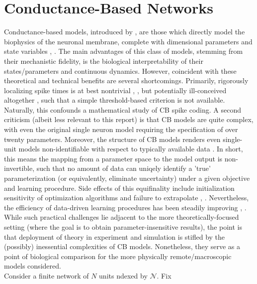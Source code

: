 \documentclass[12pt, oneside]{report}
\newcommand{\1}[1]{\mathbbm{1}_{\{#1\}}}
\newcommand{\mc}[1]{\mathcal{#1}}
\theoremstyle{definition}
\begin{document}
\section{Conductance-Based Networks}\label{sec1}
Conductance-based models, introduced by \cite{Hodgkin_Huxley_1952}, are those
which directly model the biophysics of the neuronal membrane, complete with
dimensional parameters and state variables \cite{Ermentrout_Terman_2010}, \cite{Izhikevich_2007}. The main advantages of this class of models, stemming from
their mechanistic fidelity, is the biological interpretability of their
states/parameters and continuous dynamics. However, coincident with these
theoretical and technical benefits are several shortcomings. Primarily,
rigorously localizing spike times is at best nontrivial \cite{Kistler_Gerstner_Hemmen_1997}, \cite{Platkiewicz_Brette_2010}, \cite{Wang_Wang_Yu_Chen_2016}
but potentially ill-conceived altogether \cite{Koch_Bernander_Douglas_1995}, \cite{Rinzel_Ermentrout_1998} such that a simple threshold-based criterion
is not available. Naturally, this confounds a mathematical study of CB spike
coding. A second criticism (albeit less relevant to this report) is that
CB models are quite complex, with even the original single neuron model
requiring the specification of over twenty parameters. Moreover, the structure
of CB models renders even single-unit models non-identifiable with respect to
typically available data \cite{Walch_Eisenberg_2016}. In short, this means the
mapping from a parameter space to the model output is non-invertible, such that
no amount of data can uniqely identify a 'true' parameterization (or
equivalently, eliminate uncertainty) under a given objective and learning
procedure. Side effects of this equifinality include initialization sensitivity
of optimization algorithms and failure to extrapolate \cite{Daly_Gavaghan_Holmes_Cooper_2015},
\cite{Guillaume_et_al_2019}. Nevertheless, the efficiency of
data-driven learning procedures has been steadily improving \cite{Prinz_Billimoria_Marder_2003},
\cite{Meliza_Kostuk_Huang_Nogaret_Margoliash_Abarbanel_2014}. While such practical challenges lie adjacent to the more
theoretically-focused setting (where the goal is to obtain
parameter-insensitive results), the point is that deployment of theory in experiment and simulation
is stifled by the (possibly) inessential complexities of CB models. Nonetheless, they
serve as a point of biological comparison for the more physically
remote/macroscopic models considered.\\[5pt]
\indent Consider a finite network of $N$ units ndexed by $\mc{N}$. Fix
\end{document}
